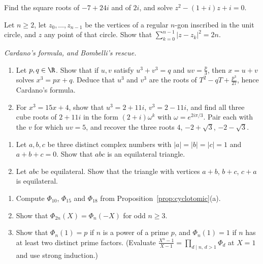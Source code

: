 \begin{exercise}[$\star$]\label{ex:sqrtz}
Find the square roots of $-7+24i$ and of $2i$, and solve $z^2-(1+i)z+i=0$.
\end{exercise}

\begin{exercise}[$\star$]\label{ex:sumdist}
Let $n\ge2$, let $z_0,\dots,z_{n-1}$ be the vertices of a regular $n$-gon inscribed in the unit circle, and $z$ any point of that circle. Show that
$\sum_{k=0}^{n-1}|z-z_k|^2=2n$.
\end{exercise}

\begin{exercise}[$\star\star$]\label{ex:cardano}
\emph{Cardano's formula, and Bombelli's rescue.}
\begin{enumerate}[label=(\alph*)]
\item Let $p,q\in\R$. Show that if $u,v$ satisfy $u^3+v^3=q$ and $uv=\frac p3$, then $x=u+v$ solves $x^3=px+q$. Deduce that $u^3$ and $v^3$ are the roots of $T^2-qT+\frac{p^3}{27}$, hence Cardano's formula.
\item For $x^3=15x+4$, show that $u^3=2+11i$, $v^3=2-11i$, and find all three cube roots of $2+11i$ in the form $(2+i)\omega^k$ with $\omega=e^{2i\pi/3}$. Pair each with the $v$ for which $uv=5$, and recover the three roots $4$, $-2+\sqrt3$, $-2-\sqrt3$.
\end{enumerate}
\end{exercise}

\begin{exercise}[$\star\star$]\label{ex:equi}
\begin{enumerate}[label=(\alph*)]
\item Let $a,b,c$ be three distinct complex numbers with $|a|=|b|=|c|=1$ and $a+b+c=0$. Show that $abc$ is an equilateral triangle.
\item Let $abc$ be equilateral. Show that the triangle with vertices $a+b$, $b+c$, $c+a$ is equilateral.
\end{enumerate}
\end{exercise}

\begin{exercise}[$\star\star$]\label{ex:cyclo}
\begin{enumerate}[label=(\alph*)]
\item Compute $\Phi_{10}$, $\Phi_{15}$ and $\Phi_{18}$ from Proposition~\ref{prop:cyclotomic}(a).
\item Show that $\Phi_{2n}(X)=\Phi_n(-X)$ for odd $n\ge3$.
\item Show that $\Phi_n(1)=p$ if $n$ is a power of a prime $p$, and $\Phi_n(1)=1$ if $n$ has at least two distinct prime factors. (Evaluate $\frac{X^n-1}{X-1}=\prod_{d\mid n,\,d>1}\Phi_d$ at $X=1$ and use strong induction.)
\end{enumerate}
\end{exercise}

